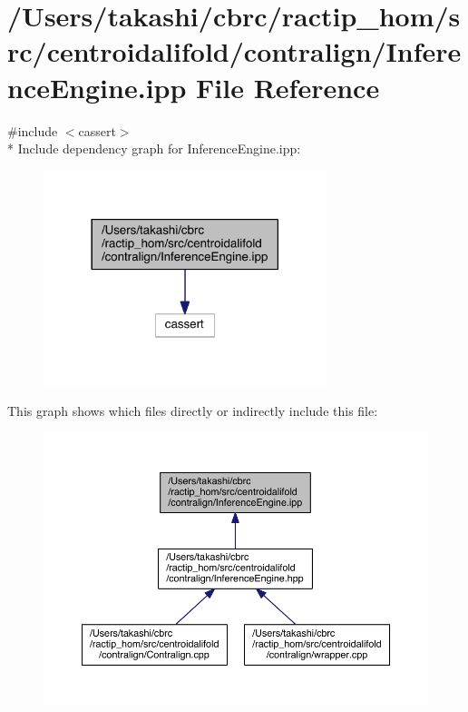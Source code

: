 \hypertarget{centroidalifold_2contralign_2_inference_engine_8ipp}{\section{/\+Users/takashi/cbrc/ractip\+\_\+hom/src/centroidalifold/contralign/\+Inference\+Engine.ipp File Reference}
\label{centroidalifold_2contralign_2_inference_engine_8ipp}
}
{\ttfamily \#include $<$cassert$>$}\\*
Include dependency graph for Inference\+Engine.\+ipp\+:
\nopagebreak
\begin{figure}[H]
\begin{center}
\leavevmode
\includegraphics[width=234pt]{centroidalifold_2contralign_2_inference_engine_8ipp__incl}
\end{center}
\end{figure}
This graph shows which files directly or indirectly include this file\+:
\nopagebreak
\begin{figure}[H]
\begin{center}
\leavevmode
\includegraphics[width=350pt]{centroidalifold_2contralign_2_inference_engine_8ipp__dep__incl}
\end{center}
\end{figure}
